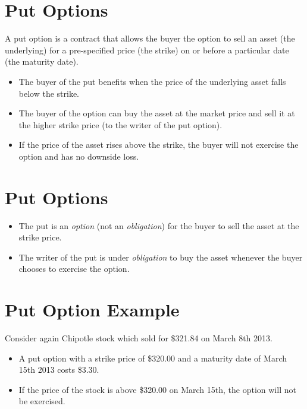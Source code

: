 \documentclass[letterpaper,10pt,english]{sphinxmanual}
\begin{document}
\section{Put Options}
\label{options:put-options}
A put option is a contract that allows the buyer the option to sell an
asset (the underlying) for a pre-specified price (the strike) on or
before a particular date (the maturity date).
\begin{itemize}
\item {} 
The buyer of the put benefits when the price of the underlying asset
falls below the strike.

\end{itemize}
\begin{itemize}
\item {} 
The buyer of the option can buy the asset at the market price and
sell it at the higher strike price (to the writer of the put
option).

\end{itemize}
\begin{itemize}
\item {} 
If the price of the asset rises above the strike, the buyer will not
exercise the option and has no downside loss.

\end{itemize}


\section{Put Options}
\label{options:id5}\begin{itemize}
\item {} 
The put is an \emph{option} (not an \emph{obligation}) for the buyer to sell
the asset at the strike price.

\end{itemize}
\begin{itemize}
\item {} 
The writer of the put is under \emph{obligation} to buy the asset
whenever the buyer chooses to exercise the option.

\end{itemize}


\section{Put Option Example}
\label{options:put-option-example}
Consider again Chipotle stock which sold for \$321.84 on March
8th 2013.
\begin{itemize}
\item {} 
A put option with a strike price of \$320.00 and a maturity date of
March 15th 2013 costs \$3.30.

\end{itemize}
\begin{itemize}
\item {} 
If the price of the stock is above \$320.00 on March 15th, the
option will not be exercised.

\end{itemize}
\end{document}

